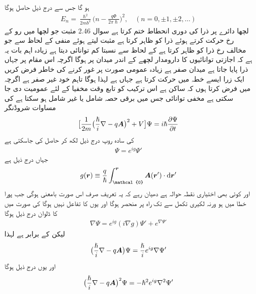 ہو گا جس سے درج ذیل حاصل ہوگا 
\begin{align} 
E_n = \frac{\hslash^2}{2m b^2} \big ( n - \frac{q \Phi}{2 \pi \hslash} \big )^2, \quad (n = 0, \pm 1, \pm 2, \dotsc)
\end{align}
لچها دائرے پر ذرا کی دوری انحطاط ختم کرتا ہے سوال 2.46 مثبت  جو لچھا میں رو کے رخ حرکت کرتے ہوئے ذرا کو ظاہر کرتا ہے  مثبت لیتے ہوئے منفی  کے لحاظ سے جو مخالف رخ ذرا کو ظاہر کرتا ہے کے لحاظ سے نسبتا کم توانائی دیتا ہے زیادہ اہم بات یہ ہے کہ اجازتی توانائیوں کا دارومدار لچھے کے اندر میدان پر ہوگا اگرچہ اس مقام پر جہاں ذرا پایا جاتا ہے میدان صفر ہے زیادہ عمومی صورت پر غور کرنے کی خاطر فرض کریں ایک زرا ایسے خطہ میں حرکت کرتا ہے جہاں  ہے لہذا  ہوگا تاہم  خود غیر صفر ہے اگرچہ میں فرض کرتا ہوں کہ  ساکن ہے اس ترکیب کو تابع وقت مخفیا کے لئے عمومیت دی جا سکتی ہے مخفی توانائی  جس میں برقی حصہ  شامل یا غیر شامل ہو سکتا ہے کی مساوات شروڈنگر 
\begin{align} 
\big [ \frac{1}{2m} \big ( \frac{\hslash}{i} \nabla - q {{\boldsymbol{A}}} \big )^2 + V \big ] \Psi = i \hslash \frac{\partial \Psi}{\partial t}
\end{align}
کی سادہ روپ درج ذیل لکھ کر حاصل کی جاسکتی ہے 
\begin{align}
\Psi = e^{i g} \Psi'
\end{align}
جہاں  درج ذیل ہے 
\begin{align}
g (\kvec{r}) \equiv \frac{q}{\hslash} \int_{\mathcal{0}}^{\kvec{r}} \kvec{A} (\kvec{r}') \cdot \dif \kvec{r}'
\end{align}
اور  کوئی بھی اختیاری نقطہ حوالہ ہے دھیان رہے کہ یہ تعریف صرف اس صورت بامعنی ہوگی جب پورا خطا میں  ہو ورنہ لکیری تکمل  سے  تک راہ پر منحصر ہوگا اور یوں  کا تفاعل نہیں ہوگا  کی صورت میں  کا ڈلوان درج ذیل ہوگا 
\begin{align*}
\nabla \Psi = e^{i g} (i \nabla g) \Psi' + e^{\nabla \Psi'}
\end{align*}
لیکن  کے برابر ہے لہذا 
\begin{align}
\big ( \frac{\hslash}{i} \nabla - q {{\boldsymbol{A}}} \big ) \Psi = \frac{\hslash}{i} e^{i g} \nabla \Psi'
\end{align}
اور یوں درج ذیل ہوگا 
\begin{align}
\big ( \frac{\hslash}{i} \nabla - q {{\boldsymbol{A}}} \big )^2 \Psi = - \hslash^2 e^{i g} \nabla^2 \Psi'
\end{align}
